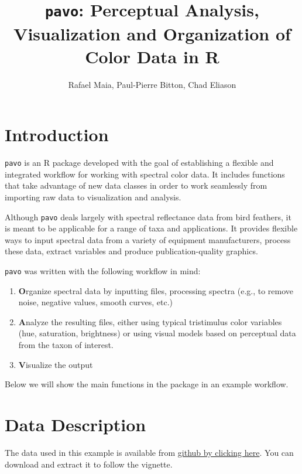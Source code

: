 \documentclass{article}
\newcommand{\pavo}{{\tt pavo}}  %
\begin{document}



\title{\pavo{}: {\bf P}erceptual {\bf A}nalysis, {\bf V}isualization and {\bf O}rganization of Color Data in R}
\author{Rafael Maia, Paul-Pierre Bitton, Chad Eliason}

\maketitle

\section*{Introduction}

\pavo{} is an R package developed with the goal of establishing a flexible and integrated 
workflow for working with spectral color data. It includes functions that take advantage of
new data classes in order to work seamlessly from importing raw data to visualization and 
analysis.

Although \pavo{} deals largely with spectral reflectance data from bird feathers, it is meant 
to be applicable for a range of taxa and applications. It provides flexible ways to input
spectral data from a variety of equipment manufacturers, process these data, extract variables 
and produce publication-quality graphics.

\pavo{} was written with the following workflow in mind:

\begin{enumerate}
\item {\bf O}rganize spectral data by inputting files, processing spectra (e.g., to remove
noise, negative values, smooth curves, etc.)
\item {\bf A}nalyze the resulting files, either using typical tristimulus color variables (hue,
saturation, brightness) or using visual models based on perceptual data from the taxon of interest.
\item {\bf V}isualize the output
\end{enumerate}

Below we will show the main functions in the package in an example workflow. 

\section{Data Description}

The data used in this example is available from 
\href{https://github.com/rmaia/pavo/blob/master/vignette_data/vignette_data.zip}{github by clicking here}. 
You can download and extract it to follow the vignette.
\end{document}
